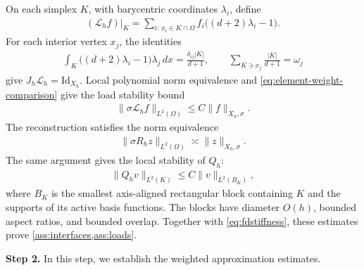 \documentclass[print,wide,eng]{draft}
\begin{document}
On each simplex $K$, with barycentric coordinates $\lambda_i$, define
%
\begin{align*}
(\mathcal L_hf)|_K
=\sum_{i:\,x_i\in K\cap\Omega}f_i\big((d+2)\lambda_i-1\big).
\end{align*}
%
For each interior vertex $x_j$, the identities
%
\begin{align*}
\int_K\big((d+2)\lambda_i-1\big)\lambda_j\,dx
=\frac{\delta_{ij}|K|}{d+1},\qquad
\sum_{K\ni x_j}\frac{|K|}{d+1}=\omega_j
\end{align*}
%
give $J_h\mathcal L_h=\mathrm{Id}_{X_h}$. Local polynomial norm equivalence and \cref{eq:element-weight-comparison} give the load stability bound
%
\begin{align*}
\|\sigma\mathcal L_hf\|_{L^2(\Omega)}\leq C\|f\|_{X_h,\sigma}.
\end{align*}
%
The reconstruction satisfies the norm equivalence
%
\begin{align}\label{eq:fd-local-stability}
\|\sigma R_hz\|_{L^2(\Omega)}\asymp\|z\|_{X_h,\sigma}.
\end{align}
%
The same argument gives the local stability of $Q_h$:
%
\begin{align}\label{eq:fd-projection-stability}
\|Q_hv\|_{L^2(K)}\leq C\|v\|_{L^2(B_K)},
\end{align}
%
where $B_K$ is the smallest axis-aligned rectangular block containing $K$ and the supports of its active basis functions. The blocks have diameter $O(h)$, bounded aspect ratios, and bounded overlap. Together with \cref{eq:fdstiffness}, these estimates prove \cref{ass:interfaces,ass:loads}.

\smallskip

{\bf Step 2.}
In this step, we establish the weighted approximation estimates.
\end{document}
